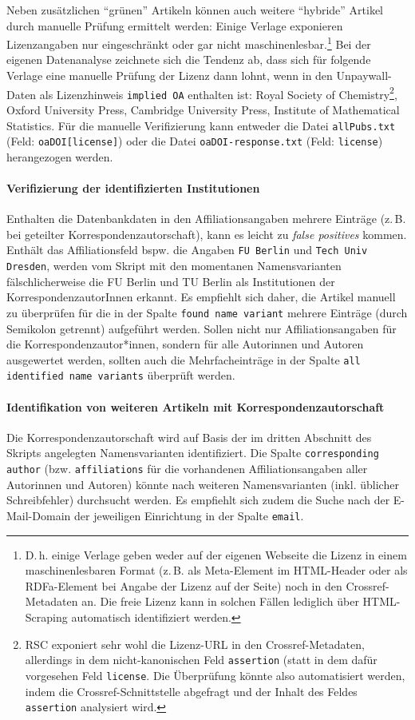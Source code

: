 Neben zusätzlichen "`grünen"' Artikeln können auch weitere "`hybride"' Artikel durch manuelle Prüfung ermittelt werden: Einige Verlage exponieren Lizenzangaben nur eingeschränkt oder gar nicht maschinenlesbar.\footnote{D.\,h. einige Verlage geben weder auf der eigenen Webseite die Lizenz in einem maschinenlesbaren Format (z.\,B. als Meta-Element im HTML-Header oder als RDFa-Element bei Angabe der Lizenz auf der Seite) noch in den Crossref-Metadaten an. Die freie Lizenz kann in solchen Fällen lediglich über HTML-Scraping automatisch identifiziert werden.} Bei der eigenen Datenanalyse zeichnete sich die Tendenz ab, dass sich für folgende Verlage eine manuelle Prüfung der Lizenz dann lohnt, wenn in den Unpaywall-Daten als Lizenzhinweis \texttt{implied OA} enthalten ist: Royal Society of Chemistry\footnote{RSC exponiert sehr wohl die Lizenz-URL in den Crossref-Metadaten, allerdings in dem nicht-kanonischen Feld \texttt{assertion} (statt in dem dafür vorgesehen Feld \texttt{license}. Die Überprüfung könnte also automatisiert werden, indem die Crossref-Schnittstelle abgefragt und der Inhalt des Feldes \texttt{assertion} analysiert wird.}, Oxford University Press, Cambridge University Press, Institute of Mathematical Statistics. Für die manuelle Verifizierung kann entweder die Datei \texttt{allPubs.txt} (Feld: \texttt{oaDOI[license]}) oder die Datei \texttt{oaDOI-response.txt} (Feld: \texttt{license}) herangezogen werden.

\paragraph{Verifizierung der identifizierten Institutionen} Enthalten die Datenbankdaten in den Affiliationsangaben mehrere Einträge (z.\,B. bei geteilter Korrespondenzautorschaft), kann es leicht zu \textit{false positives} kommen. Enthält das Affiliationsfeld bspw. die Angaben \texttt{FU Berlin} und \texttt{Tech Univ Dresden}, werden vom Skript mit den momentanen Namensvarianten fälschlicherweise die FU Berlin und TU Berlin als Institutionen der KorrespondenzautorInnen erkannt. Es empfiehlt sich daher, die Artikel manuell zu überprüfen für die in der Spalte \texttt{found name variant} mehrere Einträge (durch Semikolon getrennt) aufgeführt werden. Sollen nicht nur Affiliationsangaben für die Korrespondenzautor*innen, sondern für alle Autorinnen und Autoren ausgewertet werden, sollten auch die Mehrfacheinträge in der Spalte \texttt{all identified name variants} überprüft werden. 

\paragraph{Identifikation von weiteren Artikeln mit Korrespondenzautorschaft} Die Korrespondenzautorschaft wird auf Basis der im dritten Abschnitt des Skripts angelegten Namensvarianten identifiziert. Die Spalte \texttt{corresponding author} (bzw. \texttt{affiliations} für die vorhandenen Affiliationsangaben aller Autorinnen und Autoren) könnte nach weiteren Namensvarianten (inkl. üblicher Schreibfehler) durchsucht werden. Es empfiehlt sich zudem die Suche nach der E-Mail-Domain der jeweiligen Einrichtung in der Spalte \texttt{email}.

